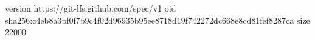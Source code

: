 version https://git-lfs.github.com/spec/v1
oid sha256:c4eb8a3bf0f7b9c4f02d96935b95ee8718d19f742272dc668e8cd81fef8287ca
size 22000
